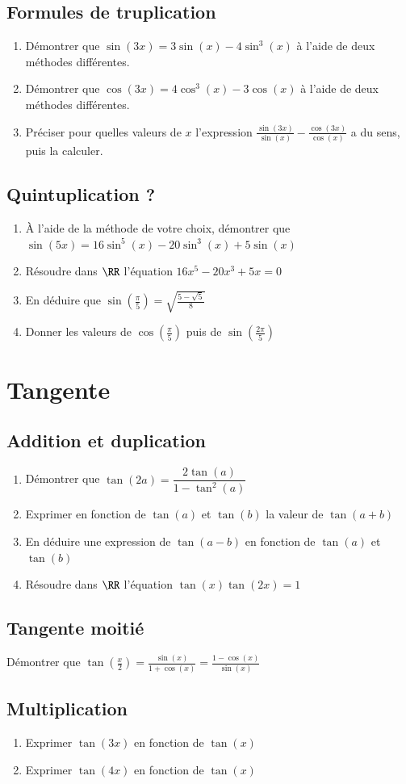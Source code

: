 \documentclass[oneside,12pt]{article}          %
\begin{document}
\subsection{Formules de truplication}
\begin{enumerate}
	\item Démontrer que $\sin(3x)=3\sin(x)-4\sin^3(x)$ à l'aide de deux méthodes différentes.
	\item Démontrer que $\cos(3x)=4\cos^3(x)-3\cos(x)$ à l'aide de deux méthodes différentes.
	\item Préciser pour quelles valeurs de $x$ l'expression $\frac{\sin(3x)}{\sin(x)}-\frac{\cos(3x)}{\cos(x)}$ a du sens, puis la calculer.
\end{enumerate}



\subsection{Quintuplication ?}
\begin{enumerate}
	\item À l'aide de la méthode de votre choix, démontrer que $\sin(5x)=16\sin^5(x)-20\sin^3(x)+5\sin(x)$
	\item Résoudre dans $\RR$ l'équation $16x^5-20x^3+5x=0$
	\item En déduire que $\sin\left(\frac{\pi}{5}\right)=\sqrt{\frac{5-\sqrt{5}}{8}}$
	\item Donner les valeurs de $\cos\left(\frac{\pi}{5}\right)$ puis de $\sin\left(\frac{2\pi}{5}\right)$
\end{enumerate}



\section{Tangente}

\subsection{Addition et duplication}
\begin{enumerate}
	\item Démontrer que $\tan(2a)=\dfrac{2\tan(a)}{1-\tan^2(a)}$
	\item Exprimer en fonction de $\tan(a)$ et $\tan(b)$ la valeur de $\tan(a+b)$
	\item En déduire une expression de $\tan(a-b)$ en fonction de $\tan(a)$ et $\tan(b)$
	\item Résoudre dans $\RR$ l'équation $\tan(x)\tan(2x)=1$
\end{enumerate}



\subsection{Tangente moitié}

Démontrer que $\tan\left(\frac{x}{2}\right)=\frac{\sin(x)}{1+\cos(x)}=\frac{1-\cos(x)}{\sin(x)}$



\subsection{Multiplication}
\begin{enumerate}
	\item Exprimer $\tan(3x)$ en fonction de $\tan(x)$
	\item Exprimer $\tan(4x)$ en fonction de $\tan(x)$
\end{enumerate}
\end{document}

